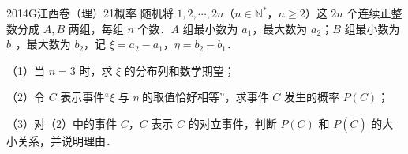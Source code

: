 
\begin{problem}{2014}{G}{江西卷（理）}{21}{概率}
随机将 $1,2,\cdots,2n$（$n\in\mathbb{N}^*$，$n\geq2$）这 $2n$ 个连续正整数分成 $A,B$ 两组，每组 $n$ 个数．$A$ 组最小数为 $a_1$，最大数为 $a_2$；$B$ 组最小数为 $b_1$，最大数为 $b_2$，记 $\xi=a_2-a_1$，$\eta=b_2-b_1$．

（1）当 $n=3$ 时，求 $\xi$ 的分布列和数学期望；

（2）令 $C$ 表示事件“$\xi$ 与 $\eta$ 的取值恰好相等”，求事件 $C$ 发生的概率 $P(C)$；

（3）对（2）中的事件 $C$，$\overline{C}$ 表示 $C$ 的对立事件，判断 $P(C)$ 和 $P(\overline{C})$ 的大小关系，并说明理由．
\end{problem}